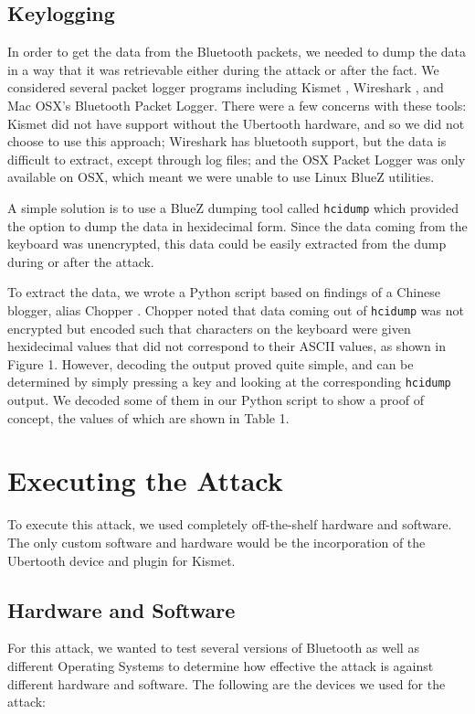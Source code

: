 \documentclass{acm_proc_article-sp}
\begin{document}
\subsection{Keylogging}
In order to get the data from the Bluetooth packets, we needed to dump the data in a way that it was retrievable either during the attack or after the fact. We considered several packet logger programs including Kismet \cite{kismet}, Wireshark \cite{wireshark}, and Mac OSX's Bluetooth Packet Logger. There were a few concerns with these tools: Kismet did not have support without the Ubertooth hardware, and so we did not choose to use this approach; Wireshark has bluetooth support, but the data is difficult to extract, except through log files; and the OSX Packet Logger was only available on OSX, which meant we were unable to use Linux BlueZ utilities. 

A simple solution is to use a BlueZ dumping tool called \texttt{hcidump} which provided the option to dump the data in hexidecimal form. Since the data coming from the keyboard was unencrypted, this data could be easily extracted from the dump during or after the attack. 

To extract the data, we wrote a Python script based on findings of a Chinese blogger, alias Chopper \cite{chopper}. Chopper noted that data coming out of \texttt{hcidump} was not encrypted but encoded such that characters on the keyboard were given hexidecimal values that did not correspond to their ASCII values, as shown in Figure 1. However, decoding the output proved quite simple, and can be determined by simply pressing a key and looking at the corresponding \texttt{hcidump} output. We decoded some of them in our Python script to show a proof of concept, the values of which are shown in Table 1.



\section{Executing the Attack}
To execute this attack, we used completely off-the-shelf hardware and software. The only custom software and hardware would be the incorporation of the Ubertooth device and plugin for Kismet. 

\subsection{Hardware and Software}
For this attack, we wanted to test several versions of Bluetooth as well as different Operating Systems to determine how effective the attack is against different hardware and software. The following are the devices we used for the attack:
\end{document}
